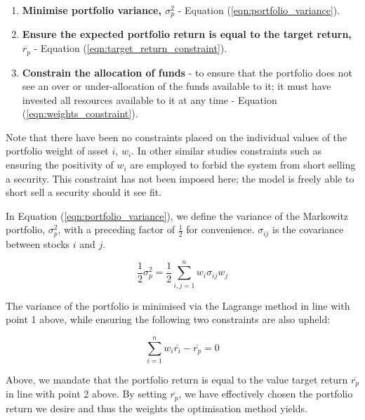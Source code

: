 \documentclass{article}
\begin{document}
\begin{enumerate}
	\item \textbf{Minimise portfolio variance, $\sigma_p^2$}  - Equation (\ref{eqn:portfolio_variance}).

	\item \textbf{Ensure the expected portfolio return is equal to the target return, $\overline{r_p}$} - Equation (\ref{eqn:target_return_constraint}).
	
	\item \textbf{Constrain the allocation of funds} - to ensure that the portfolio does not see an over or under-allocation of the funds available to it; it must have invested all resources available to it at any time - Equation (\ref{eqn:weights_constraint}).
	
\end{enumerate}

Note that there have been no constraints placed on the individual values of the portfolio weight of asset $i$, $w_i$. In other similar studies \cite{mpt} constraints such as ensuring the positivity of $w_i$ are employed to forbid the system from short selling a security. This constraint has not been imposed here; the model is freely able to short sell a security should it see fit.

In Equation (\ref{eqn:portfolio_variance}), we define the variance of the Markowitz portfolio, $\sigma_{p}^{2}$, with a preceding factor of $\frac{1}{2}$ for convenience. $\sigma_{ij}$ is the covariance between stocks $i$ and $j$.


\begin{equation}
\dfrac{1}{2} \sigma^{2}_{p} =  \dfrac{1}{2} \sum_{i,j=1}^{n} w_{i} \sigma_{ij} w_{j}
\label{eqn:portfolio_variance}
\end{equation}

The variance of the portfolio is minimised via the Lagrange method in line with point 1 above, while ensuring the following two constraints are also upheld:

\begin{equation}
\sum_{i=1}^{n} w_{i} \overline{r_i} - \overline{r_p} = 0
\label{eqn:target_return_constraint}
\end{equation}

Above, we mandate that the portfolio return is equal to the value target return $\overline{r_p}$ in line with point 2 above. By setting $\overline{r_p}$, we have effectively chosen the portfolio return we desire and thus the weights the optimisation method yields.
\end{document}
